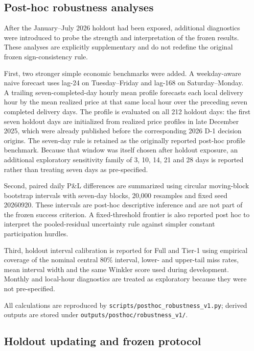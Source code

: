 \subsection{Post-hoc robustness analyses}
\label{sec:posthoc_methods}

After the January--July 2026 holdout had been exposed, additional diagnostics were introduced to probe the strength and interpretation of the frozen results. These analyses are explicitly supplementary and do not redefine the original frozen sign-consistency rule.

First, two stronger simple economic benchmarks were added. A weekday-aware naive forecast uses lag-24 on Tuesday--Friday and lag-168 on Saturday--Monday. A trailing seven-completed-day hourly mean profile forecasts each local delivery hour by the mean realized price at that same local hour over the preceding seven completed delivery days. The profile is evaluated on all 212 holdout days: the first seven holdout days are initialized from realized price profiles in late December 2025, which were already published before the corresponding 2026 D-1 decision origins. The seven-day rule is retained as the originally reported post-hoc profile benchmark. Because that window was itself chosen after holdout exposure, an additional exploratory sensitivity family of 3, 10, 14, 21 and 28 days is reported rather than treating seven days as pre-specified.

Second, paired daily P\&L differences are summarized using circular moving-block bootstrap intervals with seven-day blocks, 20,000 resamples and fixed seed 20260920. These intervals are post-hoc descriptive inference and are not part of the frozen success criterion. A fixed-threshold frontier is also reported post hoc to interpret the pooled-residual uncertainty rule against simpler constant participation hurdles.

Third, holdout interval calibration is reported for Full and Tier-1 using empirical coverage of the nominal central 80\% interval, lower- and upper-tail miss rates, mean interval width and the same Winkler score used during development. Monthly and local-hour diagnostics are treated as exploratory because they were not pre-specified.

All calculations are reproduced by \texttt{scripts/posthoc\_robustness\_v1.py}; derived outputs are stored under \texttt{outputs/posthoc/robustness\_v1/}.
\subsection{Holdout updating and frozen protocol}

